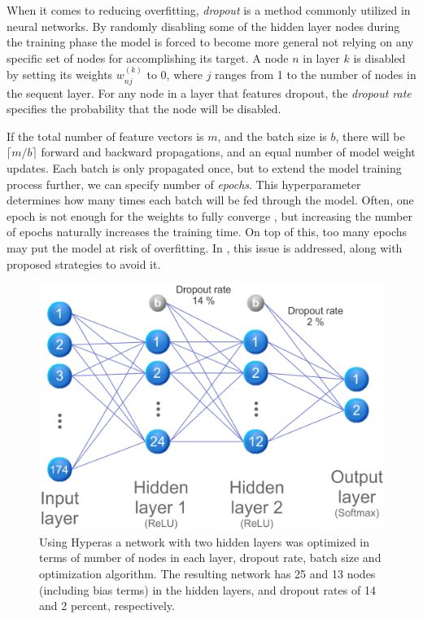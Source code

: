 When it comes to reducing overfitting, \emph{dropout} is a method commonly utilized in neural networks. By randomly disabling some of the hidden layer nodes during the training phase the model is forced to become more general not relying on any specific set of nodes for accomplishing its target. A node $n$ in layer $k$ is disabled by setting its weights $w^{(k)}_{nj}$ to 0, where $j$ ranges from 1 to the number of nodes in the sequent layer. For any node in a layer that features dropout, the \emph{dropout rate} specifies the probability that the node will be disabled.

If the total number of feature vectors is $m$, and the batch size is $b$, there will be $\lceil m/b \rceil$ forward and backward propagations, and an equal number of model weight updates. Each batch is only propagated once, but to extend the model training process further, we can specify number of \emph{epochs}. This hyperparameter determines how many times each batch will be fed through the model. Often, one epoch is not enough for the weights to fully converge \citep{kriesel_2007}, but increasing the number of epochs naturally increases the training time. On top of this, too many epochs may put the model at risk of overfitting. In \citep{prechelt_2000}, this issue is addressed, along with proposed strategies to avoid it.

\begin{figure}[h]
	\centering
	\includegraphics[scale=0.5]{figs_temp/optimized_network_graph.jpg}
	\caption{Using Hyperas a network with two hidden layers was optimized in terms of number of nodes in each layer, dropout rate, batch size and optimization algorithm. The resulting network has 25 and 13 nodes (including bias terms) in the hidden layers, and dropout rates of 14 and 2 percent, respectively.}
	\label{fig:opt_net}
\end{figure}

